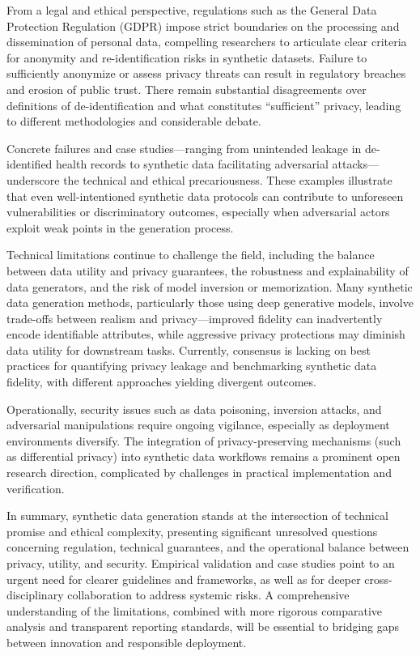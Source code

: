 \documentclass[sigconf]{acmart}
\begin{document}
From a legal and ethical perspective, regulations such as the General Data Protection Regulation (GDPR) impose strict boundaries on the processing and dissemination of personal data, compelling researchers to articulate clear criteria for anonymity and re-identification risks in synthetic datasets. Failure to sufficiently anonymize or assess privacy threats can result in regulatory breaches and erosion of public trust. There remain substantial disagreements over definitions of de-identification and what constitutes ``sufficient'' privacy, leading to different methodologies and considerable debate.

Concrete failures and case studies—ranging from unintended leakage in de-identified health records to synthetic data facilitating adversarial attacks—underscore the technical and ethical precariousness. These examples illustrate that even well-intentioned synthetic data protocols can contribute to unforeseen vulnerabilities or discriminatory outcomes, especially when adversarial actors exploit weak points in the generation process.

Technical limitations continue to challenge the field, including the balance between data utility and privacy guarantees, the robustness and explainability of data generators, and the risk of model inversion or memorization. Many synthetic data generation methods, particularly those using deep generative models, involve trade-offs between realism and privacy—improved fidelity can inadvertently encode identifiable attributes, while aggressive privacy protections may diminish data utility for downstream tasks. Currently, consensus is lacking on best practices for quantifying privacy leakage and benchmarking synthetic data fidelity, with different approaches yielding divergent outcomes.

Operationally, security issues such as data poisoning, inversion attacks, and adversarial manipulations require ongoing vigilance, especially as deployment environments diversify. The integration of privacy-preserving mechanisms (such as differential privacy) into synthetic data workflows remains a prominent open research direction, complicated by challenges in practical implementation and verification.

In summary, synthetic data generation stands at the intersection of technical promise and ethical complexity, presenting significant unresolved questions concerning regulation, technical guarantees, and the operational balance between privacy, utility, and security. Empirical validation and case studies point to an urgent need for clearer guidelines and frameworks, as well as for deeper cross-disciplinary collaboration to address systemic risks. A comprehensive understanding of the limitations, combined with more rigorous comparative analysis and transparent reporting standards, will be essential to bridging gaps between innovation and responsible deployment.
\end{document}
